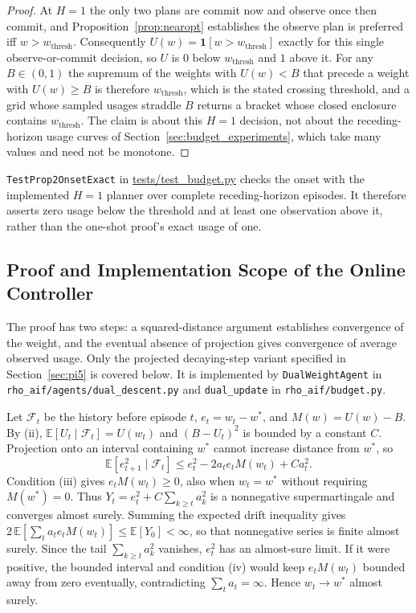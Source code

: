 \documentclass[manuscript, screen, review]{jair}
\begin{document}
\begin{proof}
At $H{=}1$ the only two plans are commit now and observe once then commit, and Proposition~\ref{prop:nearopt} establishes the observe plan is preferred iff $w > w_{\mathrm{thresh}}$. Consequently $U(w) = \mathbf{1}[w > w_{\mathrm{thresh}}]$ exactly for this single observe-or-commit decision, so $U$ is $0$ below $w_{\mathrm{thresh}}$ and $1$ above it. For any $B \in (0,1)$ the supremum of the weights with $U(w) < B$ that precede a weight with $U(w) \ge B$ is therefore $w_{\mathrm{thresh}}$, which is the stated crossing threshold, and a grid whose sampled usages straddle $B$ returns a bracket whose closed enclosure contains $w_{\mathrm{thresh}}$. The claim is about this $H{=}1$ decision, not about the receding-horizon usage curves of Section~\ref{sec:budget_experiments}, which take many values and need not be monotone.
\end{proof}

\texttt{TestProp2OnsetExact} in \url{tests/test_budget.py} checks the onset with the implemented $H=1$ planner over complete receding-horizon episodes. It therefore asserts zero usage below the threshold and at least one observation above it, rather than the one-shot proof's exact usage of one.

\subsection{Proof and Implementation Scope of the Online Controller}
\label{app:theory_controller}



The proof has two steps: a squared-distance argument establishes convergence of the weight, and the eventual absence of projection gives convergence of average observed usage. Only the projected decaying-step variant specified in Section~\ref{sec:pi5} is covered below. It is implemented by \texttt{DualWeightAgent} in \texttt{rho\_\allowbreak aif/\allowbreak agents/\allowbreak dual\_\allowbreak descent.py} and \texttt{dual\_\allowbreak update} in \texttt{rho\_\allowbreak aif/\allowbreak budget.py}.

Let $\mathcal{F}_t$ be the history before episode $t$, $e_t=w_t-w^*$, and $M(w)=U(w)-B$. By (ii), $\mathbb{E}[U_t\mid\mathcal{F}_t]=U(w_t)$ and $(B-U_t)^2$ is bounded by a constant $C$. Projection onto an interval containing $w^*$ cannot increase distance from $w^*$, so
\[
\mathbb{E}[e_{t+1}^2\mid\mathcal{F}_t]
\le e_t^2-2a_t e_t M(w_t)+C a_t^2.
\]
Condition (iii) gives $e_t M(w_t)\ge0$, also when $w_t=w^*$ without requiring $M(w^*)=0$. Thus $Y_t=e_t^2+C\sum_{k\ge t}a_k^2$ is a nonnegative supermartingale and converges almost surely. Summing the expected drift inequality gives $2\,\mathbb{E}[\sum_t a_t e_t M(w_t)]\le\mathbb{E}[Y_0]<\infty$, so that nonnegative series is finite almost surely. Since the tail $\sum_{k\ge t}a_k^2$ vanishes, $e_t^2$ has an almost-sure limit. If it were positive, the bounded interval and condition (iv) would keep $e_t M(w_t)$ bounded away from zero eventually, contradicting $\sum_t a_t=\infty$. Hence $w_t\to w^*$ almost surely.
\end{document}
